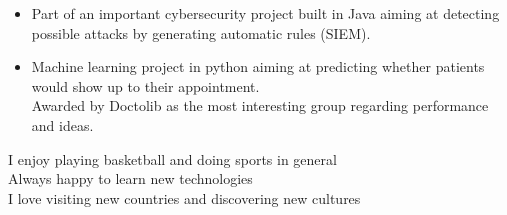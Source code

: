 \documentclass[9pt,a4paper,ragged2e]{altacv}
\begin{document}
\divider
{}
\begin{itemize}
	\item Part of an important cybersecurity project built in Java aiming at detecting possible attacks by generating automatic rules (SIEM).
\end{itemize}
\begin{itemize}
	\item Machine learning project in python aiming at predicting whether patients would show up to their appointment. \\Awarded by Doctolib as the most interesting group regarding performance and ideas.
\end{itemize}

\medskip

  \medskip
	\cvtag{\faHeartbeat} I enjoy playing basketball and doing sports in general \\
  \medskip
	\cvtag{\faChevronUp} Always happy to learn new technologies \\
  \medskip
	\cvtag{\faPlane} I love visiting new countries and discovering new cultures

\end{document}
